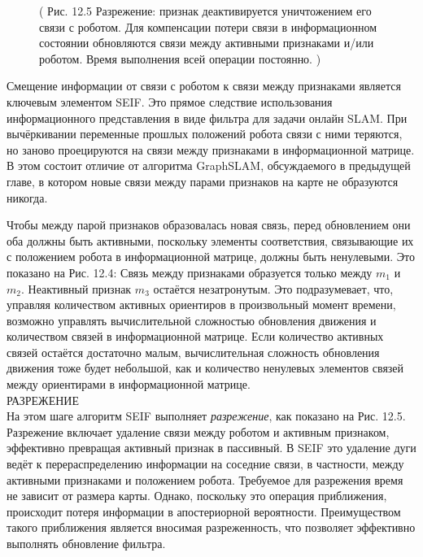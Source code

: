 \documentclass[10pt,a4paper]{article}
\begin{document}
\begin{figure}[H]
	\caption{ ( Рис. 12.5 Разрежение: признак деактивируется уничтожением его связи с роботом. Для компенсации потери связи в информационном состоянии обновляются связи между активными признаками и/или роботом. Время выполнения всей операции постоянно. ) }
	\label{fig:125orig}
\end{figure}

Смещение информации от связи с роботом к связи между признаками является ключевым элементом SEIF. Это прямое следствие использования информационного представления в виде фильтра для задачи онлайн SLAM. При вычёркивании переменные прошлых положений робота связи с ними теряются, но заново проецируются на связи между признаками в информационной матрице. В этом состоит отличие от алгоритма GraphSLAM, обсуждаемого в предыдущей главе, в котором новые связи между парами признаков на карте не образуются никогда.

Чтобы между парой признаков образовалась новая связь, перед обновлением они оба должны быть активными, поскольку элементы соответствия, связывающие их с положением робота в информационной матрице, должны быть ненулевыми. Это показано на Рис. 12.4: Связь между признаками образуется только между $m_1$ и $m_2$. Неактивный признак $m_3$ остаётся незатронутым. Это подразумевает, что, управляя количеством активных ориентиров в произвольный момент времени, возможно управлять вычислительной сложностью обновления движения и количеством связей в информационной матрице. Если количество активных связей остаётся достаточно малым, вычислительная сложность обновления движения тоже будет небольшой, как и количество ненулевых элементов связей между ориентирами в информационной матрице.\\

РАЗРЕЖЕНИЕ\\

На этом шаге алгоритм SEIF выполняет \textit{разрежение}, как показано на Рис. 12.5. Разрежение включает удаление связи между роботом и активным признаком, эффективно превращая активный признак в пассивный. В SEIF это удаление дуги ведёт к перераспределению информации на соседние связи, в частности, между активными признаками и положением робота. Требуемое для разрежения время не зависит от размера карты. Однако, поскольку это операция приближения, происходит потеря информации в апостериорной вероятности. Преимуществом такого приближения является вносимая разреженность, что позволяет эффективно выполнять обновление фильтра.
\end{document}
